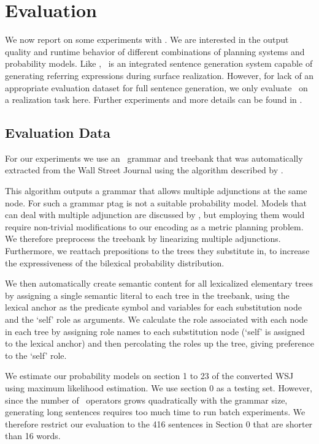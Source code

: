 \section{Evaluation}
\label{sec:experiments}

We now report on some experiments with \pcrisp. We are interested in the output quality and runtime behavior of different combinations of planning systems and probability models. Like \crisp, \pcrisp\ is an integrated sentence generation system capable of generating referring expressions during surface realization.  However, for lack of an appropriate evaluation dataset for full sentence generation, we only evaluate \pcrisp\ on a realization task here.  Further experiments and more details can be found in .

\subsection{Evaluation Data}
For our experiments we use an \ltag\ grammar and treebank that was automatically extracted from the Wall Street Journal using the algorithm described by .   

This algorithm outputs a grammar that allows multiple adjunctions at the same node. For such a grammar {\sc ptag} is not a suitable probability model. Models that can deal with multiple adjunction are discussed by , but employing them would require non-trivial modifications to our encoding as a metric planning problem. We therefore preprocess the treebank by linearizing multiple adjunctions. Furthermore, we reattach prepositions to the trees they substitute in, to increase the expressiveness of the bilexical probability distribution.

We then automatically create semantic content for all lexicalized elementary trees by assigning a single semantic literal to each tree in the treebank, using the lexical anchor as the predicate symbol and variables for each substitution node and the `self' role as arguments.  We calculate the role associated with each node in each tree by assigning role names to each substitution node (`self' is assigned to the lexical anchor) and then percolating the roles up the tree, giving preference to the `self' role.  

We estimate our probability models on section 1 to 23 of the converted WSJ using maximum likelihood estimation. We use section 0 as a testing set. However, since the number of \pcrisp\ operators grows quadratically with the grammar size, generating long sentences requires too much time to run batch experiments.  We therefore restrict our evaluation to the 416 sentences in Section 0 that are shorter than 16 words.

